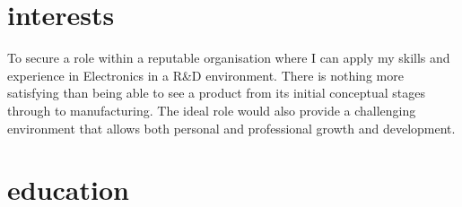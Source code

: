\documentclass[]{friggeri-cv} %
\begin{document}




\section{interests}
To secure a role within a reputable organisation where I can apply my skills and experience in Electronics in a R\&D environment. There is nothing more satisfying than being able to see a product from its initial conceptual stages through to manufacturing.
The ideal role would also provide a challenging environment that allows both personal and professional growth and development.

\section{education}
\end{document}
